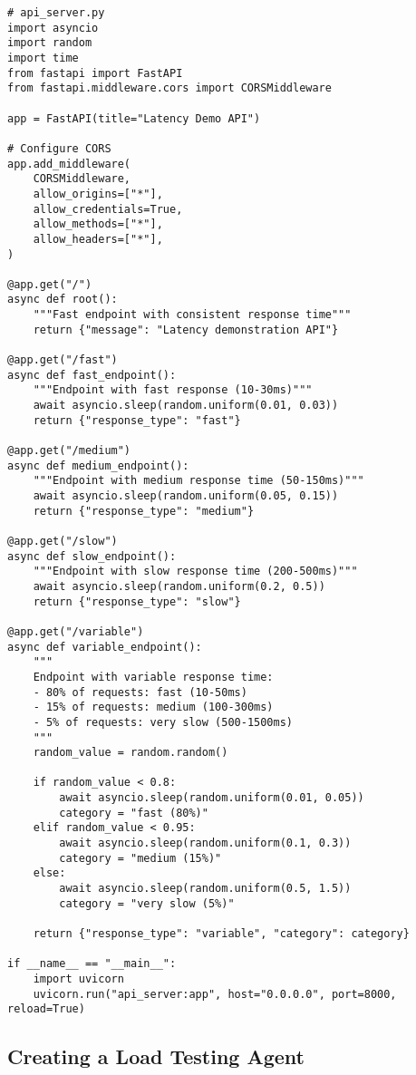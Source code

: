\documentclass[12pt,letterpaper]{article}
\newenvironment{macterminal}{%
    \begin{mdframed}[
        linecolor=terminalFrame,
        backgroundcolor=terminalBg,
        roundcorner=5pt,
        skipabove=10pt,
        skipbelow=10pt,
        linewidth=1pt,
        innertopmargin=10pt, %
        frametitle={%
            \tikz[baseline=(current bounding box.east), outer sep=0pt]{
                \fill[red!80!black] (0,0) circle (5pt);
                \fill[yellow!80!black] (0.7,0) circle (5pt);
                \fill[green!70!black] (1.4,0) circle (5pt);
            }
        },
        frametitlealignment=\raggedright, %
        frametitleaboveskip=8pt, %
        frametitlebelowskip=0pt, %
    ]
}{%
    \end{mdframed}%
}
\begin{document}
\begin{macterminal}
\begin{lstlisting}
# api_server.py
import asyncio
import random
import time
from fastapi import FastAPI
from fastapi.middleware.cors import CORSMiddleware

app = FastAPI(title="Latency Demo API")

# Configure CORS
app.add_middleware(
    CORSMiddleware,
    allow_origins=["*"],
    allow_credentials=True,
    allow_methods=["*"],
    allow_headers=["*"],
)

@app.get("/")
async def root():
    """Fast endpoint with consistent response time"""
    return {"message": "Latency demonstration API"}

@app.get("/fast")
async def fast_endpoint():
    """Endpoint with fast response (10-30ms)"""
    await asyncio.sleep(random.uniform(0.01, 0.03))
    return {"response_type": "fast"}

@app.get("/medium")
async def medium_endpoint():
    """Endpoint with medium response time (50-150ms)"""
    await asyncio.sleep(random.uniform(0.05, 0.15))
    return {"response_type": "medium"}

@app.get("/slow")
async def slow_endpoint():
    """Endpoint with slow response time (200-500ms)"""
    await asyncio.sleep(random.uniform(0.2, 0.5))
    return {"response_type": "slow"}

@app.get("/variable")
async def variable_endpoint():
    """
    Endpoint with variable response time:
    - 80% of requests: fast (10-50ms)
    - 15% of requests: medium (100-300ms)
    - 5% of requests: very slow (500-1500ms)
    """
    random_value = random.random()
    
    if random_value < 0.8:
        await asyncio.sleep(random.uniform(0.01, 0.05))
        category = "fast (80%)"
    elif random_value < 0.95:
        await asyncio.sleep(random.uniform(0.1, 0.3))
        category = "medium (15%)"
    else:
        await asyncio.sleep(random.uniform(0.5, 1.5))
        category = "very slow (5%)"
    
    return {"response_type": "variable", "category": category}

if __name__ == "__main__":
    import uvicorn
    uvicorn.run("api_server:app", host="0.0.0.0", port=8000, reload=True)
\end{lstlisting}
\end{macterminal}

\subsection{Creating a Load Testing Agent}
\end{document}

